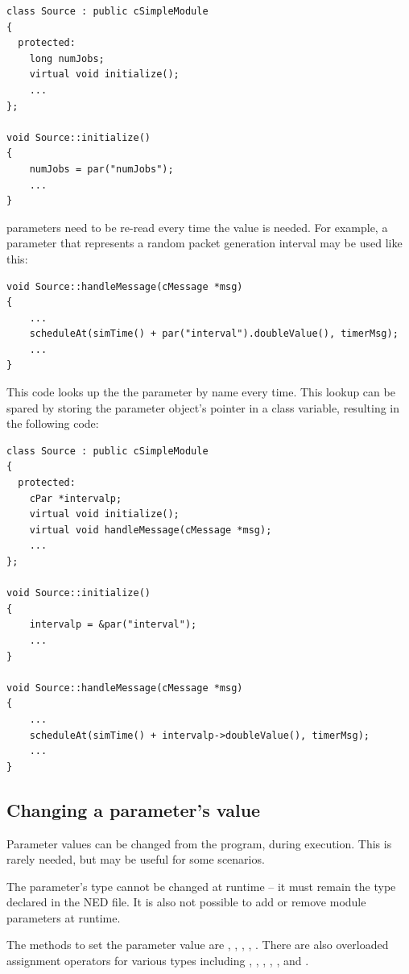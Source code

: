 \begin{verbatim}
class Source : public cSimpleModule
{
  protected:
    long numJobs;
    virtual void initialize();
    ...
};

void Source::initialize()
{
    numJobs = par("numJobs");
    ...
}
\end{verbatim}

 parameters need to be re-read every time the value is needed.
For example, a parameter that represents a random packet generation interval
may be used like this:

\begin{verbatim}
void Source::handleMessage(cMessage *msg)
{
    ...
    scheduleAt(simTime() + par("interval").doubleValue(), timerMsg);
    ...
}
\end{verbatim}

This code looks up the the parameter by name every time. This lookup
can be spared by storing the parameter object's pointer in a class variable,
resulting in the following code:

\begin{verbatim}
class Source : public cSimpleModule
{
  protected:
    cPar *intervalp;
    virtual void initialize();
    virtual void handleMessage(cMessage *msg);
    ...
};

void Source::initialize()
{
    intervalp = &par("interval");
    ...
}

void Source::handleMessage(cMessage *msg)
{
    ...
    scheduleAt(simTime() + intervalp->doubleValue(), timerMsg);
    ...
}
\end{verbatim}


\subsection{Changing a parameter's value}

Parameter values can be changed from the program, during execution.
This is rarely needed, but may be useful for some scenarios.

\begin{note}
    The parameter's type cannot be changed at runtime -- it must
    remain the type declared in the NED file. It is also not possible
    to add or remove module parameters at runtime.
\end{note}

The methods to set the parameter value are ,
, ,
, . There are also
overloaded assignment operators for various types including ,
, , , , and
.

